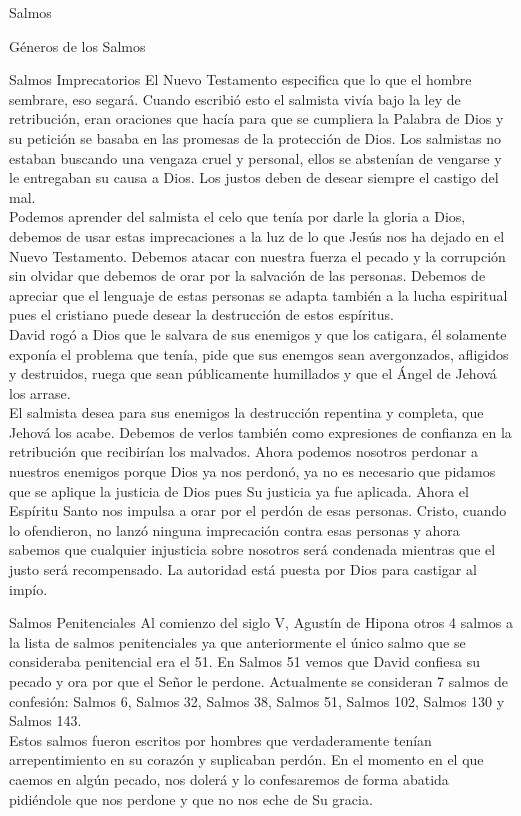 \begin{section}{Salmos}
\begin{subsection}{Géneros de los Salmos}
\begin{subsubsection}{Salmos Imprecatorios}
			El Nuevo Testamento especifica que lo que el hombre sembrare, eso segará. Cuando escribió esto el salmista vivía bajo la ley de retribución, eran oraciones que hacía para que se cumpliera la Palabra de Dios y su petición se basaba en las promesas de la protección de Dios. Los salmistas no estaban buscando una vengaza cruel y personal, ellos se abstenían de vengarse y le entregaban su causa a Dios. Los justos deben de desear siempre el castigo del mal.\\
			Podemos aprender del salmista el celo que tenía por darle la gloria a Dios, debemos de usar estas imprecaciones a la luz de lo que Jesús nos ha dejado en el Nuevo Testamento. Debemos atacar con nuestra  fuerza el pecado y la corrupción sin olvidar que debemos de orar por la salvación de las personas. Debemos de apreciar que el lenguaje de estas personas se adapta también a la lucha espiritual pues el cristiano puede desear la destrucción de estos espíritus.\\
			David rogó a Dios que le salvara de sus enemigos y que los catigara, él solamente exponía el problema que tenía, pide que sus enemgos sean avergonzados, afligidos y destruidos, ruega que sean públicamente humillados y que el Ángel de Jehová los arrase.\\
			El salmista desea para sus enemigos la destrucción repentina y completa, que Jehová los acabe. Debemos de verlos también como expresiones de confianza en la retribución que recibirían los malvados. Ahora podemos nosotros perdonar a nuestros enemigos porque Dios ya nos perdonó, ya no es necesario que pidamos que se aplique la justicia de Dios pues Su justicia ya fue aplicada. Ahora el Espíritu Santo nos impulsa a orar por el perdón de esas personas. Cristo, cuando lo ofendieron, no lanzó ninguna imprecación contra esas personas y ahora sabemos que cualquier injusticia sobre nosotros será condenada mientras que el justo será recompensado. La autoridad está puesta por Dios para castigar al impío.
		\end{subsubsection}
		\begin{subsubsection}{Salmos Penitenciales}
			Al comienzo del siglo V, Agustín de Hipona otros 4 salmos a la lista de salmos penitenciales ya que anteriormente el único salmo que se consideraba penitencial era el 51. En Salmos 51 vemos que David confiesa su pecado y ora por que el Señor le perdone. Actualmente se consideran 7 salmos de confesión: Salmos 6, Salmos 32, Salmos 38, Salmos 51, Salmos 102, Salmos 130 y Salmos 143.\\
			Estos salmos fueron escritos por hombres que verdaderamente tenían arrepentimiento en su corazón y suplicaban perdón. En el momento en el que caemos en algún pecado, nos dolerá y lo confesaremos de forma abatida pidiéndole que nos perdone y que no nos eche de Su gracia.

\end{subsubsection}
\end{subsection}
\end{section}
